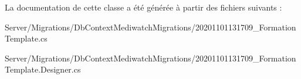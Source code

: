 La documentation de cette classe a été générée à partir des fichiers suivants \+:\begin{DoxyCompactItemize}
\item 
Server/\+Migrations/\+Db\+Context\+Mediwatch\+Migrations/20201101131709\+\_\+\+Formation\+Template.\+cs\item 
Server/\+Migrations/\+Db\+Context\+Mediwatch\+Migrations/20201101131709\+\_\+\+Formation\+Template.\+Designer.\+cs\end{DoxyCompactItemize}
